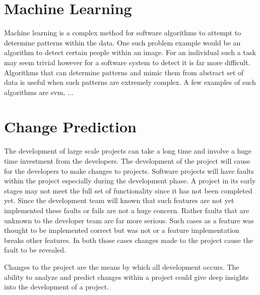 
\section{Machine Learning}

Machine learning is a complex method for software algorithms to attempt to determine patterns within the data. One such problem example would be an algorithm to detect certain people within an image. For an individual such a task may seem trivial however for a software system to detect it is far more difficult. Algorithms that can determine patterns and mimic them from abstract set of data is useful when such patterns are extremely complex. A few examples of such algorithms are \gls{svm}, ...


\section{Change Prediction}


The development of large scale projects can take a long time and involve a huge time investment from the developers. The development of the project will cause for the developers to make changes to projects. Software projects will have faults within the project especially during the development phase. A project in its early stages may not meet the full set of functionality since it has not been completed yet. Since the development team will known that such features are not yet implemented these faults or fails are not a huge concern. Rather faults that are unknown to the developer team are far more serious. Such cases as a feature was thought to be implemented correct but was not or a feature implementation breaks other features. In both those cases changes made to the project cause the fault to be revealed.

Changes to the project are the means by which all development occurs. The ability to analyze and predict changes within a project could give deep insights into the development of a project. 

